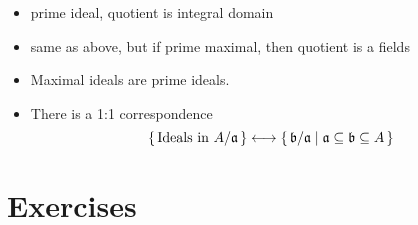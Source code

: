 \begin{thm}
    \begin{itemize}
        \item prime ideal, quotient is integral domain
        \item same as above, but if prime maximal, then quotient is a fields
        \item Maximal ideals are prime ideals.
        \item There is a 1:1 correspondence
        \begin{equation}
            \left\{\, \text{Ideals in \(A / \mathfrak{a}\)} \,\right\} \longleftrightarrow \left\{\, \mathfrak{b} / \mathfrak{a} \mathrel{\mid} \mathfrak{a} \subseteq \mathfrak{b} \subseteq A \,\right\}
        \end{equation}
    \end{itemize}
\end{thm}

\section{Exercises}